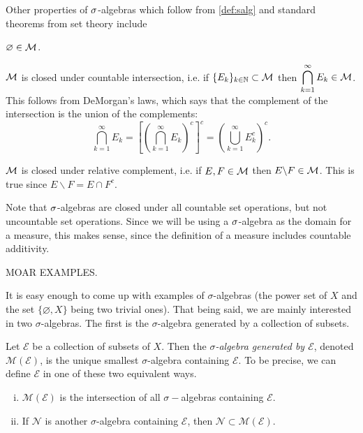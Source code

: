 \documentclass[main.tex]{subfiles}
\begin{document}
Other properties of ${\sigma}$-algebras which follow from \cref{def:salg} and standard theorems from set theory include
\begin{romannum}\setcounter{rmnum}{3}
	\item $\varnothing \in {\mathcal M}$.
	\item ${\mathcal M}$ is closed under countable intersection, i.e. if $\{E_k\}_{k \in {\mathbb N}} \subset {\mathcal M}$ then $\begin{aligned}\bigcap_{k=1}^\infty E_k \in {\mathcal M} \end{aligned}$. This follows from DeMorgan's laws, which says that the complement of the intersection is the union of the complements:
	\[
	\bigcap_{k=1}^\infty E_k = \left[ \left( \bigcap_{k=1}^\infty E_k \right)^c \right]^c
	= \left( \bigcup_{k=1}^\infty E_k^c \right)^c.
	\]
	\item ${\mathcal M}$ is closed under relative complement, i.e. if $E, F \in {\mathcal M}$ then $E \backslash F \in {\mathcal M}$. This is true since $E \backslash F = E \cap F^c$.
\end{romannum}

Note that ${\sigma}$-algebras are closed under all countable set operations, but not uncountable set operations. Since we will be using a ${\sigma}$-algebra as the domain for a measure, this makes sense, since the definition of a measure includes countable additivity. 

MOAR EXAMPLES.


It is easy enough to come up with examples of $\sigma$-algebras (the power set of $X$ and the set $\{ \varnothing, X \}$ being two trivial ones). That being said, we are mainly interested in two $\sigma$-algebras. The first is the $\sigma$-algebra generated by a collection of subsets.

\begin{definition}Let $\mathcal{E}$ be a collection of subsets of $X$. Then the \emph{$\sigma$-algebra generated by $\mathcal{E}$}, denoted $\mathcal{M}(\mathcal{E})$, is the unique smallest $\sigma$-algebra containing $\mathcal{E}$. To be precise, we can define $\mathcal{E}$ in one of these two equivalent ways.
\begin{enumerate}[(i)]
\item $\mathcal{M}(\mathcal{E})$ is the intersection of all $\sigma-$algebras containing $\mathcal{E}$.
\item If $\mathcal{N}$ is another $\sigma$-algebra containing $\mathcal{E}$, then $\mathcal{N} \subset \mathcal{M}(\mathcal{E})$.
\end{enumerate}
\end{definition}
\end{document}
